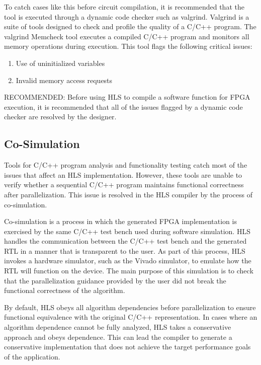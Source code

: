\par To catch cases like this before circuit compilation, it is recommended that the tool is executed through a dynamic code checker such as valgrind. Valgrind is a suite of tools designed to check and profile the quality of a C/C++ program. The valgrind Memcheck tool
executes a compiled C/C++ program and monitors all memory operations during execution. This tool flags the following critical issues:
\begin{enumerate}
  \item Use of uninitialized variables
  \item Invalid memory access requests
\end{enumerate}

\begin{highlight}
  RECOMMENDED: Before using HLS to compile a software function for FPGA execution, it is recommended that all of the issues flagged by a dynamic code checker are resolved by the designer.
\end{highlight}



\subsection{Co-Simulation}

Tools for C/C++ program analysis and functionality testing catch most of the issues that affect an HLS implementation. However, these tools are unable to verify whether a sequential C/C++ program maintains functional correctness after parallelization. This issue is resolved in the HLS compiler by the process of co-simulation.

\par Co-simulation is a process in which the generated FPGA implementation is exercised by the
same C/C++ test bench used during software simulation. HLS handles the communication
between the C/C++ test bench and the generated RTL in a manner that is transparent to the
user. As part of this process, HLS invokes a hardware simulator, such as the Vivado simulator,
to emulate how the RTL will function on the device. The main purpose of this simulation is
to check that the parallelization guidance provided by the user did not break the functional
correctness of the algorithm.

\par By default, HLS obeys all algorithm dependencies before parallelization to ensure functional
equivalence with the original C/C++ representation. In cases where an algorithm
dependence cannot be fully analyzed, HLS takes a conservative approach and obeys
dependence. This can lead the compiler to generate a conservative implementation that
does not achieve the target performance goals of the application. 

